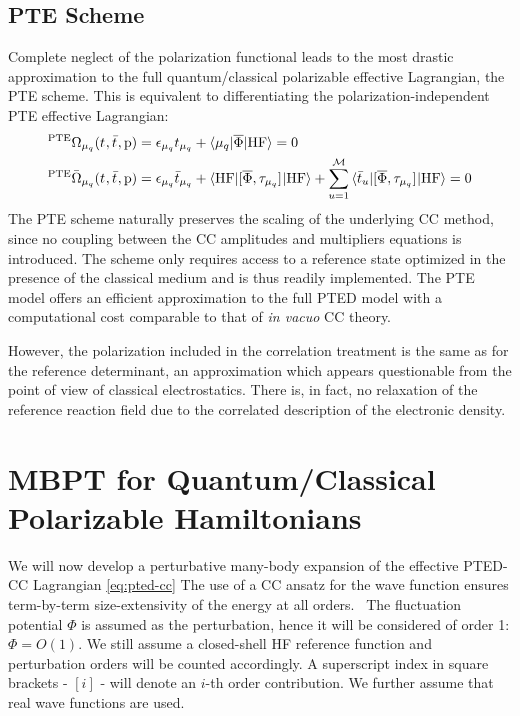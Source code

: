\subsection*{PTE Scheme}

Complete neglect of the polarization functional leads to the most
drastic approximation to the full quantum/classical polarizable
effective Lagrangian, the \acrshort{PTE} scheme.
This is equivalent to differentiating the polarization-independent
\acrshort{PTE} effective Lagrangian:
\begin{subequations}
  \begin{align}
 {}^{\mathrm{PTE}}\Omega_{\mu_q}(t_{}, \bar{t}_{}, \mathrm{p})  &=
   \epsilon_{\mu_q}t_{\mu_q} + \braket{\mu_q | \overline{\Phi} | \mathrm{HF}}
    = 0 \\
   {}^{\mathrm{PTE}}\bar{\Omega}_{\mu_q}(t_{}, \bar{t}_{}, \mathrm{p})
    &=
    \epsilon_{\mu_q}\bar{t}_{\mu_q} +
    \braket{\mathrm{HF} | [ \overline{\Phi}, \tau_{\mu_q} ]^{} | \mathrm{HF}} +
    \sum_{u=1}^{\mathcal{M}}\braket{\bar{t}_{u} |
    [ \overline{\Phi}, \tau_{\mu_q} ]^{} | \mathrm{HF}}
    = 0
  \end{align}
\end{subequations}
The \acrshort{PTE} scheme naturally preserves the scaling of the underlying
\acrshort{CC} method, since no coupling between the \acrshort{CC} amplitudes and
multipliers equations is introduced.
The scheme only requires access to a
reference state optimized in the presence of the classical medium and is
thus readily implemented.
The \acrshort{PTE} model offers an efficient approximation to the full
\acrshort{PTED} model with a computational cost comparable to that of
\emph{in vacuo} \acrshort{CC} theory.

However, the polarization included in the correlation treatment is the
same as for the reference determinant, an approximation which appears
questionable from the point of view of classical electrostatics. There
is, in fact, no relaxation of the reference reaction field due to the
correlated description of the electronic density.

\section[MBPT for Quantum/Classical Polarizable Hamiltonians]{
MBPT for Quantum/Classical Polarizable Hamiltonians}\label{sec:mbpt-polarizable}

We will now develop a perturbative many-body expansion of the effective
\acrshort{PTED}-\acrshort{CC} Lagrangian \eqref{eq:pted-cc}
The use of a \acrshort{CC} ansatz for the wave function ensures term-by-term
size-extensivity of the energy at all orders.~\autocite{Helgaker2000-tz}
The fluctuation potential $\Phi$ is assumed as the perturbation, hence
it will be considered of order 1: $\Phi = O(1)$.
We still assume a closed-shell \acrshort{HF} reference function and
perturbation orders will be counted accordingly.
A superscript index in square brackets - $[i]$ -  will denote an $i$-th
order contribution.
We further assume that real wave functions are used.

